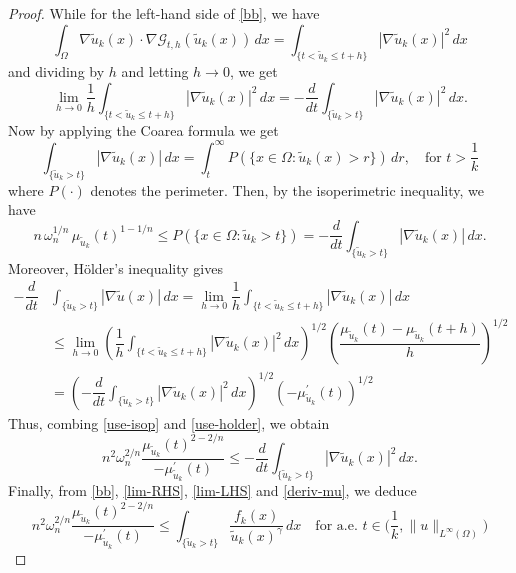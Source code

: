 \documentclass[11pt,a4paper]{amsart}
\theoremstyle{definition}
\theoremstyle{plain}
\numberwithin{equation}{section}
\begin{document}
{\begin{proof}
While for the left-hand side of \eqref{bb}, we have
\begin{equation*}
    \int_\Omega\nabla \tilde u_k(x)\cdot\nabla\mathcal{G}_{t,h}(\tilde u_k(x))\,dx=\int_{\{t<\tilde u_k\leq t+h\}}|\nabla \tilde u_k(x)|^2 \,dx
\end{equation*}
and dividing by $h$ and letting $h\to 0$, we get
\begin{equation}\label{lim-LHS}
    \lim_{h\to0}\frac{1}{h}\int_{\{t<\tilde u_k\leq t+h\}}|\nabla \tilde u_k(x)|^2\, dx=-\frac{d}{dt}\int_{\{\tilde u_k>t\}}|\nabla \tilde u_k(x)|^2\, dx.
\end{equation}
Now by applying the Coarea formula we get
$$
\int_{\{\tilde u_k>t\}}|\nabla \tilde u_k(x)| \,dx=\int_t^{\infty} P(\{x \in \Omega: \tilde u_k(x)>r\}) \,d r, \quad \text{for } t>\frac{1}{k}
$$
where $P(\cdot)$ denotes the perimeter. Then, by the isoperimetric inequality, we have
\begin{equation}\label{use-isop}
n \,\omega_n^{1/n}\, \mu_{\tilde u_k}(t)^{1-1/n} \leq P(\{x \in \Omega: \tilde u_k>t\})=-\frac{d}{d t} \int_{\{\tilde u_k>t\}}|\nabla \tilde u_k(x)| \,dx .
\end{equation}
Moreover, H\"older's inequality gives
\begin{equation}\label{use-holder}
\begin{aligned}
-\dfrac{d}{d t}& \int_{\{\tilde u_k>t\}}|\nabla \tilde u(x)| \,dx  =\lim _{h \rightarrow 0} \dfrac{1}{h} \int_{\{t<\tilde u_k \leq t+h\}}|\nabla \tilde u_k(x)| \,dx \\
& \leq \lim _{h \rightarrow 0}\left(\dfrac{1}{h} \int_{\{t<\tilde u_k \leq t+h\}}|\nabla \tilde u_k(x)|^2 \,dx\right)^{1 /2}\left(\dfrac{\mu_{\tilde u_k}(t)-\mu_{\tilde u_k}(t+h)}{h}\right)^{1/2} \\
& =\left(-\dfrac{d}{d t} \int_{\{\tilde u_k>t\}}|\nabla \tilde u_k(x)|^2 \,d x\right)^{1 / 2} \left(-\mu_{\tilde u_k}^{\prime}(t)\right)^{1 /2}
\end{aligned}
\end{equation}
Thus, combing \eqref{use-isop} and \eqref{use-holder}, we obtain
\begin{equation}\label{deriv-mu}
n^2\omega_n^{2/n} \dfrac{\mu_{\tilde u_k}(t)^{2-2/n}}{-\mu_{\tilde u_k}^{\prime}(t)} \leq -\frac{d}{d t} \int_{\{\tilde u_k>t\}}|\nabla \tilde u_k(x)|^2 \,d x.
\end{equation}
Finally, from \eqref{bb}, \eqref{lim-RHS}, \eqref{lim-LHS} and \eqref{deriv-mu}, we deduce
\begin{equation}\label{ineq-u-k}
    n^2\omega_n^{2/n} \dfrac{\mu_{\tilde u_k}(t)^{2-2/n}}{-\mu_{\tilde u_k}^{\prime}(t)} \leq \int_{\{\tilde  u_k>t\}}\dfrac{f_k(x)}{\tilde u_k(x)^\gamma}\,dx\quad \text{for a.e. }t\in\Big(\frac{1}{k},\|u\|_{L^\infty(\Omega)}\Big)

\end{equation}
\end{proof}}
\end{document}
